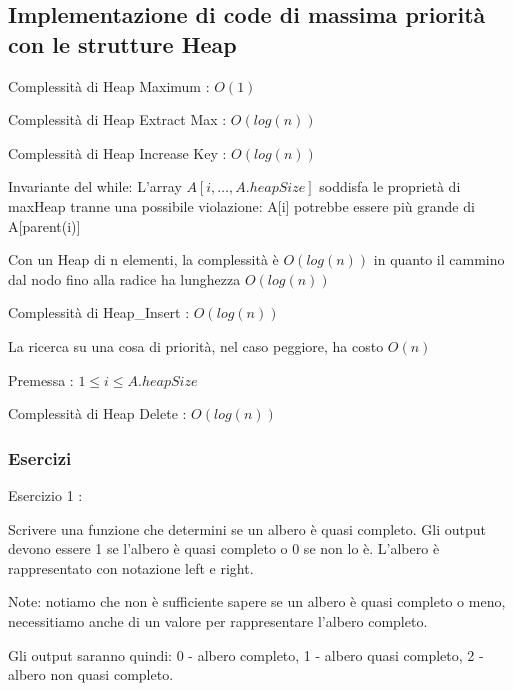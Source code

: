 \documentclass{article}
\begin{document}
{{\subsection{Implementazione di code di massima priorità con le strutture Heap}}



{Complessità di Heap Maximum : $O(1)$}



{Complessità di Heap Extract Max : $O(log(n))$}



{Complessità di Heap Increase Key : $O(log(n))$}

{Invariante del while: L'array $A[i,\ldots,A.heapSize]$ soddisfa le proprietà di maxHeap tranne una possibile violazione: A{[}i{]} potrebbe essere più grande di A{[}parent(i){]}}

{Con un Heap di n elementi, la complessità è $O(log(n))$ in quanto il cammino dal nodo fino alla radice ha lunghezza }$O(log(n))$



{Complessità di Heap\_Insert : }$O(log(n))$

{La ricerca su una cosa di priorità, nel caso peggiore, ha costo }$O(n)$

{Premessa : $1 \leq i \leq A.heapSize$}



{Complessità di Heap Delete : }$O(log(n))$

\hypertarget{h.r8bopy9q4g8f}{\subsubsection{\texorpdfstring{{Esercizi}}{Esercizi}}\label{h.r8bopy9q4g8f}}

{Esercizio 1 }{: }

{Scrivere una funzione che determini se un albero è quasi completo. Gli output devono essere 1 se l'albero è quasi completo o 0 se non lo è. }{L'albero è rappresentato con notazione left e right.}

{Note: notiamo che non è sufficiente sapere se un albero è quasi completo o meno, necessitiamo anche di un valore per rappresentare l'albero completo.}

{Gli output saranno quindi: 0 - albero completo, 1 - albero quasi completo, 2 - albero non quasi completo.}

}
\end{document}
